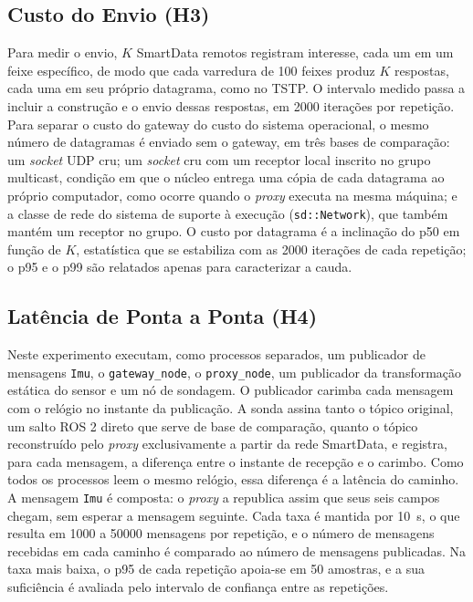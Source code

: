 \documentclass[
    12pt,
    oneside,
    a4paper,
    chapter=TITLE,
    section=TITLE,
    english,
    brazil
]{abntex2}
\begin{document}
\subsection{Custo do Envio (H3)}
Para medir o envio, $K$ SmartData remotos registram interesse, cada um em
um feixe específico, de modo que cada varredura de 100 feixes produz $K$
respostas, cada uma em seu próprio datagrama, como no TSTP. O intervalo
medido passa a incluir a construção e o envio dessas respostas, em
\num{2000} iterações por repetição. Para separar o custo do gateway do
custo do sistema operacional, o mesmo número de datagramas é enviado sem o
gateway, em três bases de comparação: um \textit{socket} UDP cru; um
\textit{socket} cru com um receptor local inscrito no grupo multicast,
condição em que o núcleo entrega uma cópia de cada datagrama ao próprio
computador, como ocorre quando o \textit{proxy} executa na mesma máquina;
e a classe de rede do sistema de suporte à execução
(\texttt{sd::Network}), que também mantém um receptor no grupo. O custo
por datagrama é a inclinação do p50 em função de $K$, estatística que se
estabiliza com as \num{2000} iterações de cada repetição; o p95 e o p99
são relatados apenas para caracterizar a cauda.

\subsection{Latência de Ponta a Ponta (H4)}
Neste experimento executam, como processos separados, um publicador de
mensagens \texttt{Imu}, o \texttt{gateway\_node}, o \texttt{proxy\_node},
um publicador da transformação estática do sensor e um nó de sondagem. O
publicador carimba cada mensagem com o relógio no instante da publicação.
A sonda assina tanto o tópico original, um salto ROS 2 direto que serve de
base de comparação, quanto o tópico reconstruído pelo \textit{proxy}
exclusivamente a partir da rede SmartData, e registra, para cada mensagem,
a diferença entre o instante de recepção e o carimbo. Como todos os
processos leem o mesmo relógio, essa diferença é a latência do caminho. A
mensagem \texttt{Imu} é composta: o \textit{proxy} a republica assim que
seus seis campos chegam, sem esperar a mensagem seguinte. Cada taxa é
mantida por \SI{10}{\second}, o que resulta em \num{1000} a
\num{50000} mensagens por repetição, e o número de mensagens recebidas em
cada caminho é comparado ao número de mensagens publicadas. Na taxa mais
baixa, o p95 de cada repetição apoia-se em 50 amostras, e a sua
suficiência é avaliada pelo intervalo de confiança entre as
repetições.
\end{document}
